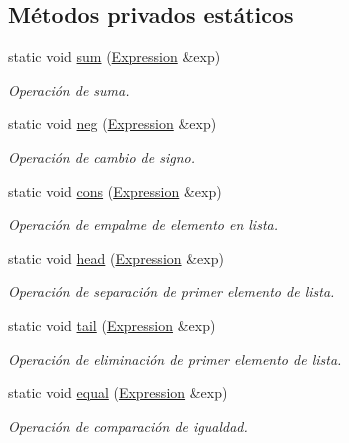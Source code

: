 \subsection*{Métodos privados estáticos}
\begin{DoxyCompactItemize}
\item 
static void \hyperlink{class_primitive_operation_space_a6de1499fb1a0f26a35f0cd11bbab8455}{sum} (\hyperlink{class_expression}{Expression} \&exp)
\begin{DoxyCompactList}\small\item\em Operación de suma. \end{DoxyCompactList}\item 
static void \hyperlink{class_primitive_operation_space_a043a5c68cf3bc3364df3edd27d1245df}{neg} (\hyperlink{class_expression}{Expression} \&exp)
\begin{DoxyCompactList}\small\item\em Operación de cambio de signo. \end{DoxyCompactList}\item 
static void \hyperlink{class_primitive_operation_space_a1fe9e08e110e0300d07ca3452cb793a0}{cons} (\hyperlink{class_expression}{Expression} \&exp)
\begin{DoxyCompactList}\small\item\em Operación de empalme de elemento en lista. \end{DoxyCompactList}\item 
static void \hyperlink{class_primitive_operation_space_a136161b42a18ffa7dcce97861fac92f6}{head} (\hyperlink{class_expression}{Expression} \&exp)
\begin{DoxyCompactList}\small\item\em Operación de separación de primer elemento de lista. \end{DoxyCompactList}\item 
static void \hyperlink{class_primitive_operation_space_a1377a01fdf14c913692d723b46e3186e}{tail} (\hyperlink{class_expression}{Expression} \&exp)
\begin{DoxyCompactList}\small\item\em Operación de eliminación de primer elemento de lista. \end{DoxyCompactList}\item 
static void \hyperlink{class_primitive_operation_space_a63b832e7fee28a3a06519023ef96d1a7}{equal} (\hyperlink{class_expression}{Expression} \&exp)
\begin{DoxyCompactList}\small\item\em Operación de comparación de igualdad. \end{DoxyCompactList}\item 

\end{DoxyCompactItemize}
